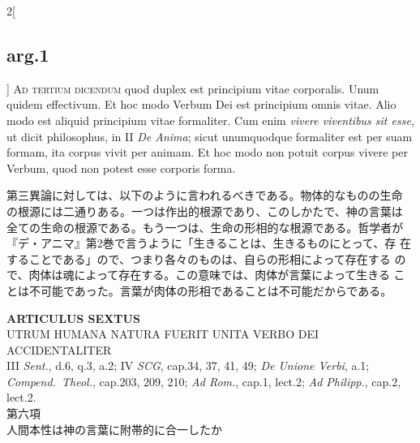 \documentclass[paper=a4paper,fontsize=10pt,jafontsize=9pt,titlepage]{jlreq}
\begin{document}
\begin{paracol}{2}[\subsection{arg.1}]
{\scshape Ad tertium dicendum} quod duplex est principium vitae
corporalis. Unum quidem effectivum. Et hoc modo Verbum Dei est
principium omnis vitae. Alio modo est aliquid principium vitae
formaliter. Cum enim {\itshape vivere viventibus sit esse}, ut dicit
philosophus, in II {\itshape De Anima}; sicut unumquodque formaliter
est per suam formam, ita corpus vivit per animam. Et hoc modo non
potuit corpus vivere per Verbum, quod non potest esse corporis forma.

\switchcolumn

第三異論に対しては、以下のように言われるべきである。物体的なものの生命
の根源には二通りある。一つは作出的根源であり、このしかたで、神の言葉は
全ての生命の根源である。もう一つは、生命の形相的な根源である。哲学者が
『デ・アニマ』第2巻で言うように「生きることは、生きるものにとって、存
在することである」ので、つまり各々のものは、自らの形相によって存在する
ので、肉体は魂によって存在する。この意味では、肉体が言葉によって生きる
ことは不可能であった。言葉が肉体の形相であることは不可能だからである。

\end{paracol}
\newpage


{}
\setcounter{section}{6}
\setcounter{subsection}{0}
\begin{center}
{\Large {\bfseries ARTICULUS SEXTUS}}\\ {\large UTRUM HUMANA NATURA FUERIT
UNITA VERBO DEI ACCIDENTALITER}\\ {\footnotesize III {\itshape Sent.},
d.6, q.3, a.2; IV {\itshape SCG}, cap.34, 37, 41, 49; {\itshape De
Unione Verbi}, a.1; {\itshape Compend.~Theol.}, cap.203, 209, 210;
{\itshape Ad Rom.}, cap.1, lect.2; {\itshape Ad Philipp.}, cap.2,
lect.2.}\\ {\Large 第六項\\人間本性は神の言葉に附帯的に合一したか}
\end{center}
\end{document}
